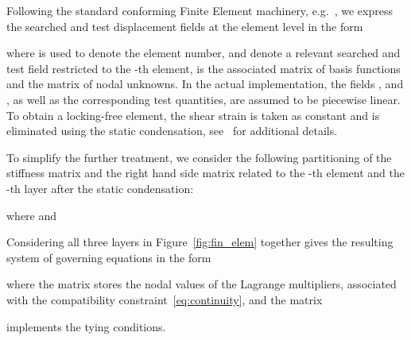 \documentclass[times,a4paper,12pt]{elsarticle}
\begin{document}
Following the standard conforming Finite Element machinery,
e.g.~\cite{Bittnar:1996:NMM,Bathe:1996:FEM}, we express the searched and test
displacement fields at the element level in the form

where  is used to denote the element number,  and
 denote a relevant searched and test field restricted
to the -th element,  is the
associated matrix of basis functions and
 the matrix of nodal unknowns. In the
actual implementation, the fields ,  and , as well as the corresponding test quantities, are
assumed to be piecewise linear. To obtain a locking-free element, the
shear strain  is taken as constant and is
eliminated using the static condensation,
see~\cite{Bittnar:1996:NMM,Bathe:1996:FEM} for additional details.

To simplify the further treatment, we consider the following
partitioning of the stiffness matrix  and the right hand
side matrix  related to the -th element and the -th
layer after the static condensation:

where  and

Considering all three layers in Figure~\ref{fig:fin_elem} together
gives the resulting system of governing equations in the form

where the matrix  stores the nodal values of the
Lagrange multipliers, associated with the compatibility
constraint~\eqref{eq:continuity}, and the matrix

implements the tying conditions.
\end{document}
